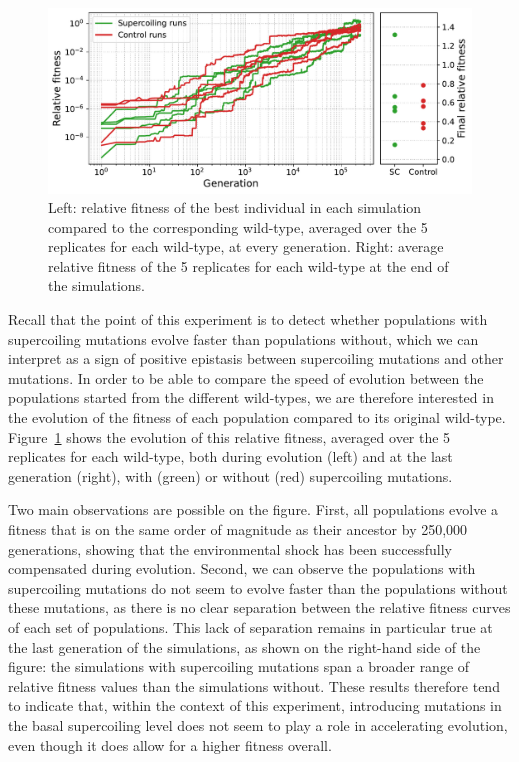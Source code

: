 \begin{figure}
\includegraphics[width=\textwidth]{epistasis/img/rel_fitness_sc_control.pdf}
\caption{Left: relative fitness of the best individual in each simulation compared to the corresponding wild-type, averaged over the 5 replicates for each wild-type, at every generation.
Right: average relative fitness of the 5 replicates for each wild-type at the end of the simulations.}
\label{fig:epistasis:rel-fitness}
\end{figure}

Recall that the point of this experiment is to detect whether populations with supercoiling mutations evolve faster than populations without, which we can interpret as a sign of positive epistasis between supercoiling mutations and other mutations.
In order to be able to compare the speed of evolution between the populations started from the different wild-types, we are therefore interested in the evolution of the fitness of each population compared to its original wild-type.
Figure~\ref{fig:epistasis:rel-fitness} shows the evolution of this relative fitness, averaged over the 5 replicates for each wild-type, both during evolution (left) and at the last generation (right), with (green) or without (red) supercoiling mutations.

Two main observations are possible on the figure.
First, all populations evolve a fitness that is on the same order of magnitude as their ancestor by 250,000 generations, showing that the environmental shock has been successfully compensated during evolution.
Second, we can observe the populations with supercoiling mutations do not seem to evolve faster than the populations without these mutations, as there is no clear separation between the relative fitness curves of each set of populations.
This lack of separation remains in particular true at the last generation of the simulations, as shown on the right-hand side of the figure: the simulations with supercoiling mutations span a broader range of relative fitness values than the simulations without.
These results therefore tend to indicate that, within the context of this experiment, introducing mutations in the basal supercoiling level does not seem to play a role in accelerating evolution, even though it does allow for a higher fitness overall.



